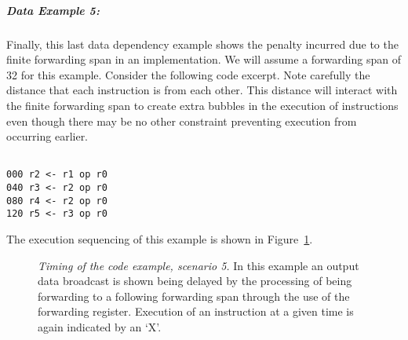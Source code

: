 \subparagraph{Data Example 5: }
Finally, this last data dependency example shows the
penalty incurred due to the finite forwarding span
in an implementation.  We will assume a forwarding span
of 32 for this example.  Consider the following
code excerpt.  Note carefully the distance that each instruction
is from each other.  This distance will interact with
the finite forwarding span to create extra bubbles in
the execution of instructions even though there may be no other
constraint preventing execution from occurring earlier.

\begin{verbatim}

000	r2 <- r1 op r0
040	r3 <- r2 op r0
080	r4 <- r2 op r0
120	r5 <- r3 op r0

\end{verbatim}

The execution sequencing of this example is shown in
Figure~\ref{ex5}.

\begin{figure}
\centering
{}
\caption{{\em Timing of the code example, scenario 5.}
In this example an output data broadcast is shown being
delayed by the processing of being forwarding
to a following forwarding span through the use
of the forwarding register.
Execution of an instruction at a given time is
again indicated by an `X'.}
\label{ex5}
\end{figure}

